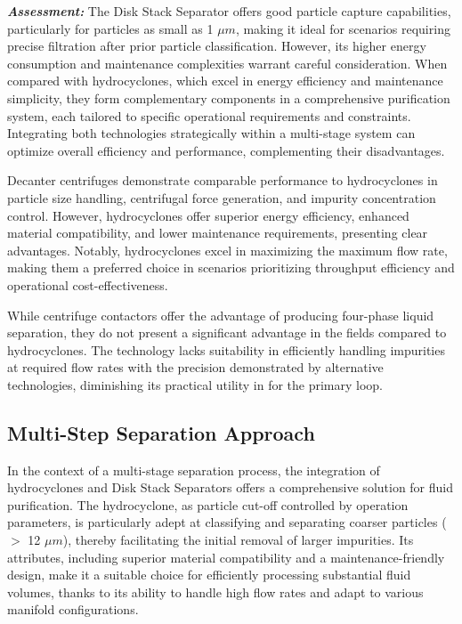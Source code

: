 \begin{tcolorbox}[colback=blue!5!white,enhanced,breakable,colframe=blue!75!black,title=Disck Stack Separator]
	\textbf{\textit{Assessment:}} The Disk Stack Separator offers good particle capture capabilities, particularly for particles as small as 1 $\mu m$, making it ideal for scenarios requiring precise filtration after prior particle classification. However, its higher energy consumption and maintenance complexities warrant careful consideration. When compared with hydrocyclones, which excel in energy efficiency and maintenance simplicity, they form complementary components in a comprehensive purification system, each tailored to specific operational requirements and constraints. Integrating both technologies strategically within a multi-stage system can optimize overall efficiency and performance, complementing their disadvantages.
	
	
\end{tcolorbox}
 \begin{tcolorbox}[colback=blue!5!white,enhanced,breakable,colframe=blue!75!black,title=Decanter Centrifuge]
	Decanter centrifuges demonstrate comparable performance to hydrocyclones in particle size handling, centrifugal force generation, and impurity concentration control. However, hydrocyclones offer superior energy efficiency, enhanced material compatibility, and lower maintenance requirements, presenting clear advantages. Notably, hydrocyclones excel in maximizing the maximum flow rate, making them a preferred choice in scenarios prioritizing throughput efficiency and operational cost-effectiveness.
\end{tcolorbox}
 \begin{tcolorbox}[colback=blue!5!white,colframe=blue!75!black,title=Centrifuge Contactor]
	While centrifuge contactors offer the advantage of producing four-phase liquid separation, they do not present a significant advantage in the fields compared to hydrocyclones. The technology lacks suitability in efficiently handling impurities at required flow rates with the precision demonstrated by alternative technologies, diminishing its practical utility in for the primary loop.
\end{tcolorbox}

\newpage
\subsection{Multi-Step Separation Approach}\label{sec:mss}
In the context of a multi-stage separation process, the integration of hydrocyclones and Disk Stack Separators offers a comprehensive solution for fluid purification. The hydrocyclone, as particle cut-off controlled by operation parameters, is particularly adept at classifying and separating coarser particles ($>$ 12 $\mu m$), thereby facilitating the initial removal of larger impurities. Its attributes, including superior material compatibility and a maintenance-friendly design, make it a suitable choice for efficiently processing substantial fluid volumes, thanks to its ability to handle high flow rates and adapt to various manifold configurations.\\


